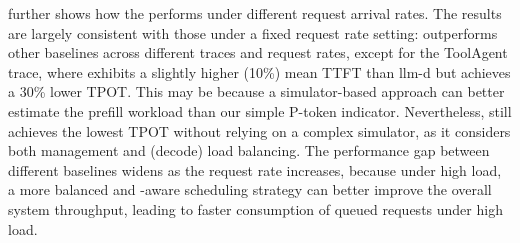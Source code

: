 {} further shows how the {\sys} performs under different request arrival rates.
The results are largely consistent with those under a fixed request rate setting:
{\sys} outperforms other baselines across different traces and request rates,
except for the ToolAgent trace,
where {\sys} exhibits a slightly higher (10\%) mean TTFT than llm-d
but achieves a 30\% lower TPOT.
This may be because a simulator-based approach can better estimate
the prefill workload than our simple P-token indicator.
Nevertheless, {\sys} still achieves the lowest TPOT without relying on a complex simulator,
as it considers both {\kvcache} management and (decode) load balancing.
The performance gap between different baselines widens as the request rate increases,
because under high load, a more balanced and {\kvcache}-aware scheduling strategy
can better improve the overall system throughput,
leading to faster consumption of queued requests under high load.

